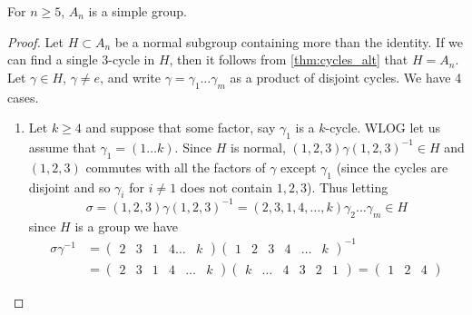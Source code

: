   \begin{theorem}
    For $n \geq 5$, $A_n$ is a simple group. 
  \end{theorem}
  \begin{proof}
    Let $H \subset A_n$ be a normal subgroup containing more than the identity. If we can find a single 3-cycle in $H$, then it follows from \ref{thm:cycles_alt} that $H = A_n$. Let $\gamma \in H$, $\gamma \neq e$, and write $\gamma = \gamma_1 \ldots \gamma_m$ as a product of disjoint cycles. We have 4 cases. 
    \begin{enumerate}
      \item Let $k \geq 4$ and suppose that some factor, say $\gamma_1$ is a $k$-cycle. WLOG let us assume that $\gamma_1 = (1 \ldots k)$. Since $H$ is normal, $(1, 2, 3) \gamma (1, 2, 3)^{-1} \in H$ and $(1, 2, 3)$ commutes with all the factors of $\gamma$ except $\gamma_1$ (since the cycles are disjoint and so $\gamma_i$ for $i \neq 1$ does not contain $1, 2, 3$). Thus letting 
      \begin{equation}
        \sigma = (1, 2, 3) \gamma (1, 2, 3)^{-1} = (2, 3, 1, 4, \ldots, k) \gamma_2 \ldots \gamma_m \in H
      \end{equation} 
      since $H$ is a group we have 
      \begin{align}
        \sigma \gamma^{-1} & = \begin{pmatrix} 2 & 3 & 1 & 4 \ldots & k \end{pmatrix} \begin{pmatrix} 1 & 2 & 3 & 4 & \ldots & k \end{pmatrix}^{-1} \\
                           & = \begin{pmatrix} 2 & 3 & 1 & 4 & \ldots & k \end{pmatrix} \begin{pmatrix} k & \ldots & 4 & 3 & 2 & 1 \end{pmatrix} = \begin{pmatrix} 1 & 2 & 4 \end{pmatrix}
      \end{align}


\end{enumerate}
\end{proof}

